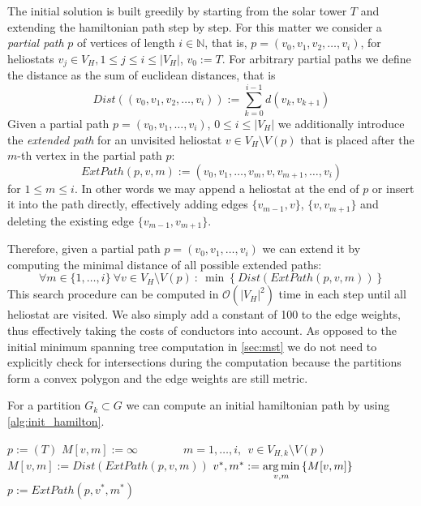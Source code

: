 The initial solution is built greedily by starting from the solar tower $T$ and extending the hamiltonian path step by step. For this matter we consider a \emph{partial path} $p$ of vertices of length $i\in\mathbb{N}$, that is, $p =(v_0, v_1, v_2, \ldots, v_i)$, for heliostats $v_j\in V_H,1\leq j \leq i \leq |V_H|$, $v_0:=T$. For arbitrary partial paths we define the distance as the sum of euclidean distances, that is
\begin{equation*}
  Dist\left((v_0,v_1,v_2,\ldots,v_i)\right) := \sum\limits_{k=0}^{i-1} d(v_k,v_{k+1})
\end{equation*}
Given a partial path $p=(v_0,v_1,\ldots,v_i)$, $0 \leq i \leq |V_H|$ we additionally introduce the \emph{extended path} for an unvisited heliostat $v\in V_H\setminus V(p)$ that is placed after the $m$-th vertex in the partial path $p$:
\begin{equation*}
  ExtPath(p,v,m) := (v_0,v_1,\ldots,v_{m},v,v_{m+1},\ldots,v_i)
\end{equation*}
for $1\leq m \leq i$. In other words we may append a heliostat at the end of $p$ or insert it into the path directly, effectively adding edges $\{v_{m-1},v\}$, $\{v,v_{m+1}\}$ and deleting the existing edge $\{v_{m-1},v_{m+1}\}$.

Therefore, given a partial path $p=(v_0,v_1,\ldots,v_i)$ we can extend it by computing the minimal distance of all possible extended paths:
\begin{equation*}
\forall m\in\{1,\ldots,i\} \ \forall v\in V_H\setminus V(p) \ :\  \min
\left\{
  Dist(ExtPath(p,v,m))
\right\}
\end{equation*}
This search procedure can be computed in $\mathcal{O}(|V_H|^2)$ time in each step until all heliostat are visited. We also simply add a constant of 100 to the edge weights, thus effectively taking the costs of conductors into account. As opposed to the initial minimum spanning tree computation in \cref{sec:mst} we do not need to explicitly check for intersections during the computation because the partitions form a convex polygon and the edge weights are still metric.

For a partition $G_k\subset G$ we can compute an initial hamiltonian path by using \cref{alg:init_hamilton}.
\begin{algorithm}[H]
  \caption{Greedy construction of a hamiltonian path for a partition $k$.}
  \label{alg:init_hamilton}
  \begin{algorithmic}[1]
    \State $p := (T)$
      \State $M[v,m] := \infty\qquad\qquad m=1,\ldots,i, \ \ v\in V_{H,k}\setminus V(p)$ 
          \State $M[v,m] :=Dist(ExtPath(p,v,m))$
        \EndFor
      \EndFor
      \State $v^\ast,m^\ast := \operatorname*{arg\,min}\limits_{v,m} \left\{M[v,m]\right\}$
      \State $p:=ExtPath(p,v^\ast,m^\ast)$
    \EndWhile
    \EndProcedure
  \end{algorithmic}
\end{algorithm}

